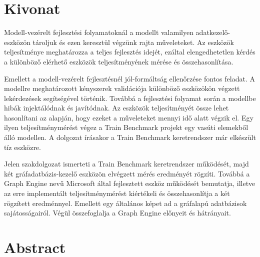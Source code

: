 \setcounter{page}{1}

\selecthungarian

\chapter*{Kivonat}

Modell-vezérelt fejlesztési folyamatoknál a modellt valamilyen adatkezelő-eszközön tároljuk és ezen keresztül végzünk rajta műveleteket. Az eszközök teljesítménye meghatározza a teljes fejlesztés idejét, ezáltal elengedhetetlen kérdés a különböző elérhető eszközök teljesítményének mérése és összehasonlítása.

Emellett a modell-vezérelt fejlesztésnél jól-formáltság ellenőrzése fontos feladat. A modellre meghatározott kényszerek validációja különböző eszközökön végzett lekérdezések segítségével történik. Továbbá a fejlesztési folyamat során a modellbe hibák injektálódnak és javítódnak. Az eszközök teljesítményét össze lehet hasonlítani az alapján, hogy ezeket a műveleteket mennyi idő alatt végzik el. Egy ilyen teljesítménymérést végez a Train Benchmark projekt egy vasúti elemekből álló modellen. A dolgozat írásakor a Train Benchmark keretrendszer már elkészült tíz eszközre.

Jelen szakdolgozat ismerteti a Train Benchmark keretrendszer működését, majd két gráfadatbázis-kezelő eszközön elvégzett mérés eredményét rögzíti. Továbbá a Graph Engine nevű Microsoft által fejlesztett eszköz működését bemutatja, illetve az erre implementált teljesítménymérést kiértékeli és összehasonlítja a két rögzített eredménnyel. Emellett egy általános képet ad a gráfalapú adatbázisok sajátosságairól. Végül összefoglalja a Graph Engine előnyeit és hátrányait.

\vfill
\selectenglish


\chapter*{Abstract}


